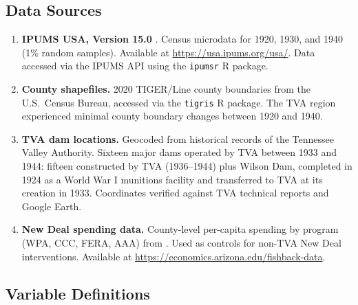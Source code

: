 \documentclass[12pt]{article}
\begin{document}
\subsection{Data Sources}

\begin{enumerate}
\item \textbf{IPUMS USA, Version 15.0} \citep{ruggles2024}. Census microdata for 1920, 1930, and 1940 (1\% random samples). Available at \url{https://usa.ipums.org/usa/}. Data accessed via the IPUMS API using the \texttt{ipumsr} R package.

\item \textbf{County shapefiles.} 2020 TIGER/Line county boundaries from the U.S.\ Census Bureau, accessed via the \texttt{tigris} R package. The TVA region experienced minimal county boundary changes between 1920 and 1940.

\item \textbf{TVA dam locations.} Geocoded from historical records of the Tennessee Valley Authority. Sixteen major dams operated by TVA between 1933 and 1944: fifteen constructed by TVA (1936--1944) plus Wilson Dam, completed in 1924 as a World War I munitions facility and transferred to TVA at its creation in 1933. Coordinates verified against TVA technical reports and Google Earth.

\item \textbf{New Deal spending data.} County-level per-capita spending by program (WPA, CCC, FERA, AAA) from \citet{fishback2003}. Used as controls for non-TVA New Deal interventions. Available at \url{https://economics.arizona.edu/fishback-data}.
\end{enumerate}

\subsection{Variable Definitions}
\end{document}
